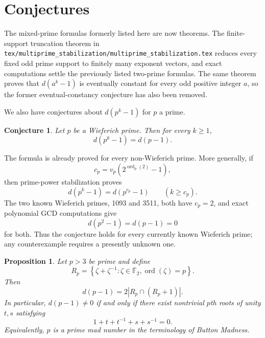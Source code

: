 \documentclass[a4paper]{article}
\newtheorem{conjecture}{Conjecture}
\newtheorem{proposition}{Proposition}
\begin{document}
	\section{Conjectures}
	The mixed-prime formulas formerly listed here are now theorems.
	The finite-support truncation theorem in
	\texttt{tex/multiprime\_stabilization/multiprime\_stabilization.tex}
	reduces every fixed odd prime support to finitely many exponent vectors, and exact computations settle the previously listed two-prime formulas.
	The same theorem proves that $d(a^k-1)$ is eventually constant for every odd positive integer $a$, so the former eventual-constancy conjecture has also been removed.

	We also have conjectures about $d(p^k - 1)$ for $p$ a prime.
	\begin{conjecture}\label{d(p^k-1)=d(p-1)}
		Let $p$ be a Wieferich prime.
		Then for every $k\geq1$,
		\begin{equation*}
			d(p^k - 1) = d(p-1).
		\end{equation*}
	\end{conjecture}
	The formula is already proved for every non-Wieferich prime.
	More generally, if
	\begin{equation*}
		c_p=v_p\!\left(2^{\operatorname{ord}_p(2)}-1\right),
	\end{equation*}
	then prime-power stabilization proves
	\begin{equation*}
		d(p^k-1)=d(p^{c_p}-1)
		\qquad(k\geq c_p).
	\end{equation*}
	The two known Wieferich primes, 1093 and 3511, both have $c_p=2$, and exact polynomial GCD computations give
	\begin{equation*}
		d(p^2-1)=d(p-1)=0
	\end{equation*}
	for both.
	Thus the conjecture holds for every currently known Wieferich prime; any counterexample requires a presently unknown one.

	\begin{proposition}\label{prime-mad-characterization}
		Let $p>3$ be prime and define
		\begin{equation*}
			R_p=
			\left\{
				\zeta+\zeta^{-1}:
				\zeta\in\overline{\mathbb{F}}_2,
				\operatorname{ord}(\zeta)=p
			\right\}.
		\end{equation*}
		Then
		\begin{equation*}
			d(p-1)=2\left|R_p\cap(R_p+1)\right|.
		\end{equation*}
		In particular, $d(p-1)\neq0$ if and only if there exist nontrivial $p$th roots of unity $t,s$ satisfying
		\begin{equation*}
			1+t+t^{-1}+s+s^{-1}=0.
		\end{equation*}
		Equivalently, $p$ is a prime mad number in the terminology of \textit{Button Madness}.
	\end{proposition}
\end{document}
